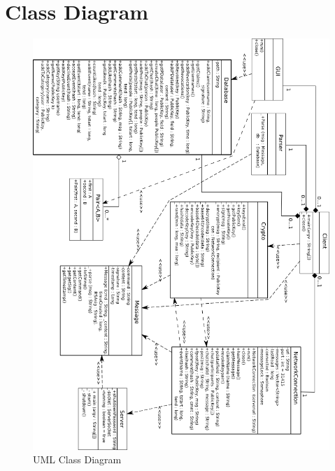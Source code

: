 \section{Class Diagram}
\begin{figure}[H]
    \centering
    \includegraphics[width=\textwidth]{images/design/class_diagram.png}
    \caption{UML Class Diagram}
    \label{fig:class_diagram}
\end{figure}
